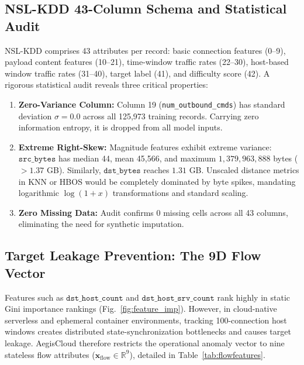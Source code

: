 \documentclass[conference]{IEEEtran}
\begin{document}
\subsection{NSL-KDD 43-Column Schema and Statistical Audit}
NSL-KDD comprises 43 attributes per record: basic connection features (0--9), payload content features (10--21), time-window traffic rates (22--30), host-based window traffic rates (31--40), target label (41), and difficulty score (42). A rigorous statistical audit reveals three critical properties:
\begin{enumerate}
\item \textbf{Zero-Variance Column:} Column 19 (\texttt{num\_outbound\_cmds}) has standard deviation $\sigma = 0.0$ across all 125,973 training records. Carrying zero information entropy, it is dropped from all model inputs.
\item \textbf{Extreme Right-Skew:} Magnitude features exhibit extreme variance: $\texttt{src\_bytes}$ has median 44, mean 45,566, and maximum $1,379,963,888$ bytes ($>1.37$ GB). Similarly, $\texttt{dst\_bytes}$ reaches $1.31$ GB. Unscaled distance metrics in KNN or HBOS would be completely dominated by byte spikes, mandating logarithmic $\log(1+x)$ transformations and standard scaling.
\item \textbf{Zero Missing Data:} Audit confirms 0 missing cells across all 43 columns, eliminating the need for synthetic imputation.
\end{enumerate}

\subsection{Target Leakage Prevention: The 9D Flow Vector}
Features such as $\texttt{dst\_host\_count}$ and $\texttt{dst\_host\_srv\_count}$ rank highly in static Gini importance rankings (Fig.~\ref{fig:feature_imp}). However, in cloud-native serverless and ephemeral container environments, tracking 100-connection host windows creates distributed state-synchronization bottlenecks and causes target leakage. AegisCloud therefore restricts the operational anomaly vector to nine stateless flow attributes ($\mathbf{x}_{\mathrm{flow}} \in \mathbb{R}^9$), detailed in Table~\ref{tab:flowfeatures}.
\end{document}
